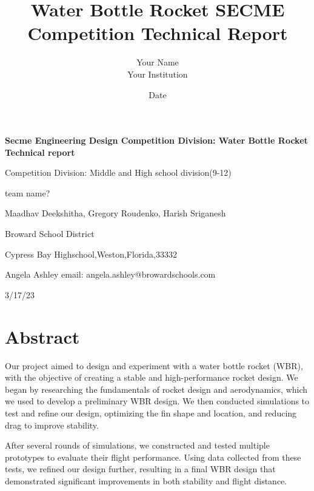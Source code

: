 \documentclass[11pt]{article}
\title{Water Bottle Rocket SECME Competition Technical Report}
\author{Your Name\\Your Institution}
\date{Date}
\begin{document}
\begin{titlepage}
    \begin{center}
        \vspace*{1cm}
        
        \huge{\textbf{Secme Engineering Design Competition Division: Water Bottle Rocket Technical report}}
        
        \vspace{0.5cm}
        \large{Competition Division: Middle and High school division(9-12)}

        \large{team name?}

        \vspace{0.25 cm}
        \large{Maadhav Deekshitha, Gregory Roudenko, Harish Sriganesh}

        \large{Broward School District}
                
        \large{Cypress Bay Highschool,Weston,Florida,33332}
        
        
        \large{Angela Ashley email: angela.ashley@browardschools.com}
        
        \vspace{1cm}
                
        
        \large{3/17/23}
        
    \end{center}
\end{titlepage}

\tableofcontents

\clearpage
{}


\section{Abstract}
Our project aimed to design and experiment with a water bottle rocket (WBR), with the objective of creating a stable and high-performance rocket design. We began by researching the fundamentals of rocket design and aerodynamics, which we used to develop a preliminary WBR design. We then conducted simulations to test and refine our design, optimizing the fin shape and location, and reducing drag to improve stability.

After several rounds of simulations, we constructed and tested multiple prototypes to evaluate their flight performance. Using data collected from these tests, we refined our design further, resulting in a final WBR design that demonstrated significant improvements in both stability and flight distance.
\end{document}
